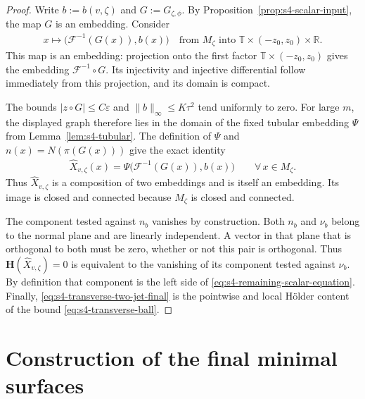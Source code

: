 \documentclass[a4paper,11pt,oneside,reqno]{amsart}
\numberwithin{equation}{section}
\theoremstyle{definition}
\begin{document}
\begin{proof}
    Write $b:=b(v,\zeta)$ and $G:=G_{\zeta,\phi}$.
    By Proposition~\ref{prop:s4-scalar-input}, the map $G$
    is an embedding. Consider
    \begin{align*}
        x\mapsto
        \bigl(\mathcal F^{-1}(G(x)),b(x)\bigr)
        \quad\text{from }M_\zeta\text{ into }
        \mathbb T\times(-z_0,z_0)\times\mathbb R.
    \end{align*}
    This map is an embedding: projection onto the first
    factor $\mathbb T\times(-z_0,z_0)$ gives the embedding
    $\mathcal F^{-1}\circ G$. Its injectivity and injective
    differential follow immediately from this projection,
    and its domain is compact.

    The bounds $|z\circ G|\leq C\varepsilon$ and
    $\|b\|_\infty\leq K\tau^2$ tend uniformly to zero.
    For large $m$, the displayed graph therefore lies in
    the domain of the fixed tubular embedding $\Psi$ from
    Lemma~\ref{lem:s4-tubular}. The definition of $\Psi$
    and $n(x)=N(\pi(G(x)))$ give the exact identity
    \begin{align*}
        \widehat X_{v,\zeta}(x)
        =\Psi\bigl(\mathcal F^{-1}(G(x)),b(x)\bigr)
        \qquad\forall\,x\in M_\zeta.
    \end{align*}
    Thus $\widehat X_{v,\zeta}$ is a composition of two
    embeddings and is itself an embedding. Its image is
    closed and connected because $M_\zeta$ is closed
    and connected.

    The component tested against $n_b$ vanishes by construction.
    Both $n_b$ and $\nu_b$ belong to the normal plane and are
    linearly independent. A vector in that plane that is
    orthogonal to both must be zero, whether or not this
    pair is orthogonal. Thus $\mathbf H(\widehat X_{v,\zeta})=0$
    is equivalent to the vanishing of its component tested
    against $\nu_b$. By definition that
    component is the left side of
    \eqref{eq:s4-remaining-scalar-equation}. Finally,
    \eqref{eq:s4-transverse-two-jet-final} is the pointwise and
    local H\"older content of the bound
    \eqref{eq:s4-transverse-ball}.
\end{proof}
%
\section{Construction of the final minimal surfaces}
\label{sec:s4-coupled}
\end{document}
